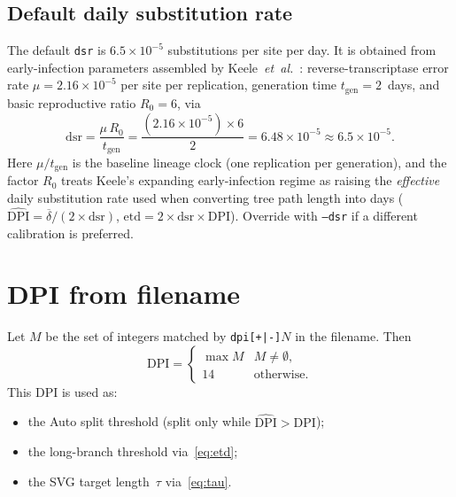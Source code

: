 \documentclass[11pt,a4paper]{article}
\begin{document}
\subsection{Default daily substitution rate}
\label{sec:dsr}
The default \texttt{dsr} is $6.5\times10^{-5}$ substitutions per site per day.
It is obtained from early-infection parameters assembled by Keele~\emph{et~al.}\
\cite{Keele2008}: reverse-transcriptase error rate
$\mu=2.16\times10^{-5}$ per site per replication, generation time
$t_{\mathrm{gen}}=2$~days, and basic reproductive ratio $R_0=6$, via
\begin{equation}
  \mathrm{dsr}=\frac{\mu\,R_0}{t_{\mathrm{gen}}}
  =\frac{(2.16\times10^{-5})\times 6}{2}
  =6.48\times10^{-5}
  \approx 6.5\times10^{-5}.
  \label{eq:dsr}
\end{equation}
Here $\mu/t_{\mathrm{gen}}$ is the baseline lineage clock (one replication per
generation), and the factor $R_0$ treats Keele's expanding early-infection
regime as raising the \emph{effective} daily substitution rate used when
converting tree path length into days
($\widehat{\mathrm{DPI}}=\overline{\delta}/(2\times\mathrm{dsr})$,
$\mathrm{etd}=2\times\mathrm{dsr}\times\mathrm{DPI}$).
Override with \texttt{--dsr} if a different calibration is preferred.

\section{DPI from filename}
\label{sec:dpi}

Let $M$ be the set of integers matched by \texttt{dpi[+|-]$N$} in the
filename. Then
\[
  \mathrm{DPI}=
  \begin{cases}
    \max M & M\neq\emptyset,\\
    14 & \text{otherwise}.
  \end{cases}
\]
This DPI is used as:
\begin{itemize}[nosep]
  \item the Auto split threshold (split only while $\widehat{\mathrm{DPI}}>\mathrm{DPI}$);
  \item the long-branch threshold via~\eqref{eq:etd};
  \item the SVG target length~$\tau$ via~\eqref{eq:tau}.
\end{itemize}

\end{document}
